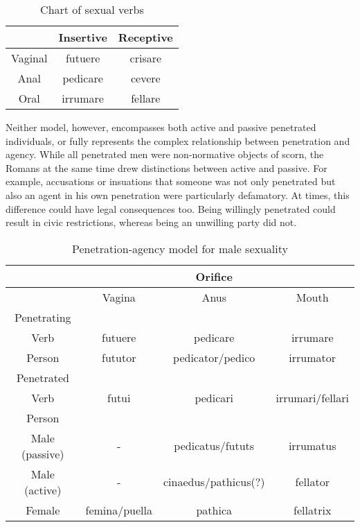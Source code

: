 \begin{table}[H]
    \centering
    \caption{Chart of sexual verbs}
    \begin{tabular}{ccc}
        \hline
        & Insertive & Receptive \\ \hline
        Vaginal & futuere & crisare \\
        Anal & pedicare & cevere \\
        Oral & irrumare & fellare \\ \hline
    \end{tabular}
    \label{tab:sexverb}
\end{table}

Neither model, however, encompasses both active and passive penetrated individuals, or fully represents the complex relationship between penetration and agency. While all penetrated men were non-normative objects of scorn, the Romans at the same time drew distinctions between active and passive. For example, accusations or insuations that someone was not only penetrated but also an agent in his own penetration were particularly defamatory. At times, this difference could have legal consequences too. Being willingly penetrated could result in civic restrictions, whereas being an unwilling party did not.

\begin{table}[H]
    \centering
    \caption{Penetration-agency model for male sexuality}
    \begin{tabular}{cccc}
        \hline 
            & & Orifice & \\ \hline
            & Vagina & Anus & Mouth \\ 
            Penetrating & & & \\
            Verb & futuere & pedicare & irrumare \\
            Person & fututor & pedicator/pedico & irrumator \\
            Penetrated & & & \\
            Verb & futui & pedicari & irrumari/fellari \\
            Person & & & \\
            Male (passive) & - & pedicatus/fututs & irrumatus \\
            Male (active) & - & cinaedus/pathicus(?) & fellator \\
            Female & femina/puella & pathica & fellatrix \\ \hline
    \end{tabular}
    \label{tab:penAgModel}
\end{table}





